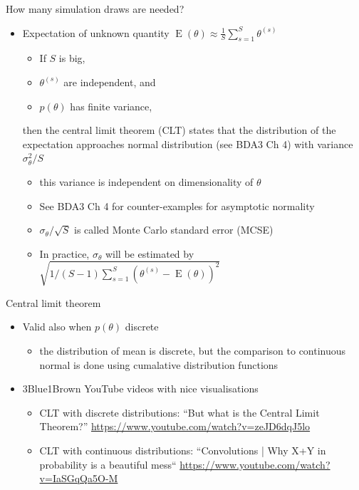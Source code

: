 \documentclass[english,t]{beamer}
\DeclareMathOperator{\E}{E}
\begin{document}
\begin{frame}{How many simulation draws are needed?}

  \begin{itemize}
  \item Expectation of unknown quantity $\E(\theta)\approx \frac{1}{S}\sum_{s=1}^S \theta^{(s)}$
    \begin{itemize}
    \item If $S$ is big,
    \item $\theta^{(s)}$ are independent, and 
    \item $p(\theta)$ has finite variance,
    \end{itemize}
    then the central limit theorem (CLT) states
    that the distribution of the expectation approaches normal
    distribution (see BDA3 Ch 4) with variance $\sigma^2_\theta/S$
    \begin{itemize}
    \item<1-> this variance is independent on dimensionality of $\theta$
    \item<2-> See BDA3 Ch 4 for counter-examples for asymptotic normality
      \pause
    \item<3-> $\sigma_\theta/\sqrt{S}$ is called Monte Carlo standard
      error (MCSE)
      \item<4-> In practice, $\sigma_{\theta}$ will be estimated by $ \sqrt{1/(S-1)\sum_{s = 1}^S (\theta^{(s)} - \E(\theta))^2}$
    \end{itemize}
\end{itemize}

\end{frame}

\begin{frame}{Central limit theorem}

  \begin{itemize}
  \item<+-> Valid also when $p(\theta)$ discrete
    \begin{itemize}
    \item the distribution of mean is discrete, but the comparison to
      continuous normal is done using cumalative distribution
      functions
    \end{itemize}
  \item<+-> 3Blue1Brown YouTube videos with nice visualisations
    \begin{itemize}
    \item CLT with discrete distributions: ``But what is the Central Limit Theorem?'' \url{https://www.youtube.com/watch?v=zeJD6dqJ5lo}
    \item CLT with continuous distributions: ``Convolutions | Why X+Y in probability is a beautiful mess``  \url{https://www.youtube.com/watch?v=IaSGqQa5O-M}
    \end{itemize}
  \end{itemize}
\end{frame}
\end{document}
